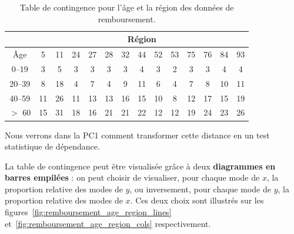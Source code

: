   \begin{table}[h]
    \centering
    \begin{tabular}[h]{|c|c|c|c|c|c|c|c|c|c|c|c|c|c|}
      \hline
      & \multicolumn{13}{|c|}{Région} \\ \hline
      {Âge} & 5 & 11 & 24 & 27 & 28 & 32 & 44 & 52 & 53 & 75 & 76 & 84 & 93 \\ \hline
      0--19 & 3 & 5 & 3 & 3 & 3 & 3 & 4 & 3 & 2 & 3 & 3 & 4 & 4 \\ \hline
      20--39 & 8 & 18 & 4 & 7 & 4 & 9 & 11 & 6 & 4 & 7 & 8 & 10 & 11 \\ \hline
      40--59 & 11 & 26 & 11 & 13 & 13 & 16 & 15 & 10 & 8 & 12 & 17 & 15 & 19 \\ \hline
      $>$ 60 & 15 & 31 & 18 & 16 & 21 & 21 & 22 & 12 & 12 & 19 & 24 & 23 & 26 \\ \hline
    \end{tabular}
    \caption{Table de contingence pour l'âge et la région des données 
      de remboursement.}
    \label{tab:remboursement_age_region}
  \end{table}

Nous verrons dans la PC1 comment transformer cette distance en
un test statistique de dépendance.


La table de contingence peut être visualisée grâce à deux \textbf{diagrammes en
  barres empilées} : on peut choisir de visualiser, pour chaque mode de $x$, la
proportion relative des modes de $y$, ou inversement, pour chaque mode de $y$,
la proportion relative des modes de $x$. Ces deux choix sont illustrés sur les
figures~\ref{fig:remboursement_age_region_lines}
et~\ref{fig:remboursement_age_region_cols} respectivement.

